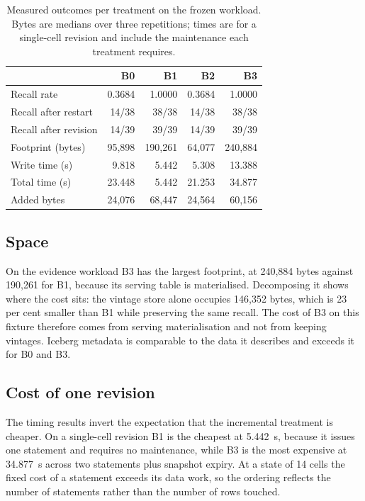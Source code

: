 \documentclass[a4paper,fleqn]{cas-dc}
\begin{document}
\begin{table}[t]
\caption{Measured outcomes per treatment on the frozen workload. Bytes are
medians over three repetitions; times are for a single-cell revision and include
the maintenance each treatment requires.}\label{tbl:res}
\begin{tabular*}{\tblwidth}{@{}lrrrr@{}}
\toprule
 & B0 & B1 & B2 & B3 \\
\midrule
Recall rate & 0.3684 & 1.0000 & 0.3684 & 1.0000 \\
Recall after restart & 14/38 & 38/38 & 14/38 & 38/38 \\
Recall after revision & 14/39 & 39/39 & 14/39 & 39/39 \\
Footprint (bytes) & 95,898 & 190,261 & 64,077 & 240,884 \\
Write time (s) & 9.818 & 5.442 & 5.308 & 13.388 \\
Total time (s) & 23.448 & 5.442 & 21.253 & 34.877 \\
Added bytes & 24,076 & 68,447 & 24,564 & 60,156 \\
\bottomrule
\end{tabular*}
\end{table}

\subsection{Space}

On the evidence workload B3 has the largest footprint, at 240,884 bytes against
190,261 for B1, because its serving table is materialised. Decomposing it shows
where the cost sits: the vintage store alone occupies 146,352 bytes, which is 23
per cent smaller than B1 while preserving the same recall. The cost of B3 on
this fixture therefore comes from serving materialisation and not from keeping
vintages. Iceberg metadata is comparable to the data it describes and exceeds it
for B0 and B3.

\subsection{Cost of one revision}

The timing results invert the expectation that the incremental treatment is
cheaper. On a single-cell revision B1 is the cheapest at 5.442~s, because it
issues one statement and requires no maintenance, while B3 is the most expensive
at 34.877~s across two statements plus snapshot expiry. At a state of 14 cells
the fixed cost of a statement exceeds its data work, so the ordering reflects
the number of statements rather than the number of rows touched.
\end{document}
